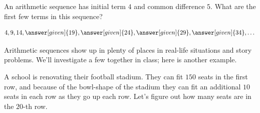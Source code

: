 \documentclass{ximera}
\begin{document}
\begin{question}
An arithmetic sequence has initial term $4$ and common difference $5$. What are the first few terms in this sequence?
\begin{prompt}
\[
4, 9, 14, \answer[given]{19}, \answer[given]{24}, \answer[given]{29}, \answer[given]{34}, \dots
\]
\end{prompt}
\end{question}
Arithmetic sequences show up in plenty of places in real-life situations and story problems. We'll investigate a few together in class; here is another example.
\begin{example}
A school is renovating their football stadium. They can fit $150$ seats in the first row, and because of the bowl-shape of the stadium they can fit an additional $10$ seats in each row as they go up each row. Let's figure out how many seats are in the $20$-th row. 


\end{example}
\end{document}
